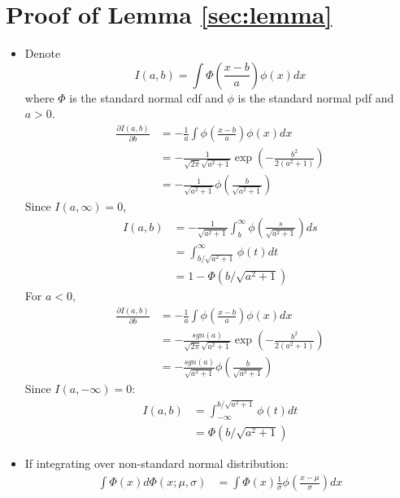 \documentclass[12pt]{article}
\begin{document}
\section{Proof of Lemma \ref{sec:lemma}}
\label{sec:proof}
\begin{itemize}
\item Denote
  \begin{displaymath}
    I(a,b) = \int \Phi \left( \frac{x-b}{a} \right)\phi(x) dx 
  \end{displaymath}
  where $\Phi$ is the standard normal cdf and $\phi$ is the standard normal
  pdf and $a > 0$.
  \begin{align*}
    \frac{\partial I(a,b)}{\partial b} & = - \frac{1}{a} \int \phi \left( \frac{x-b}{a} \right) \phi(x) dx \\
    & = - \frac{1}{\sqrt{2 \pi} \sqrt{a^2+1}} \exp \left( - \frac{b^2}{2(a^2+1)} \right)\\
    & = -\frac{1}{\sqrt{a^2+1}} \phi \left( \frac{b}{\sqrt{a^2+1}} \right)
  \end{align*}
  Since $I(a, \infty) = 0$,
  \begin{align}
    I(a,b) &= - \frac{1}{\sqrt{a^2+1}} \int_b^{\infty} \phi \left( \frac{s}{\sqrt{a^2+1}} \right) ds \nonumber \\
    &= \int_{b/\sqrt{a^2+1}}^{\infty} \phi(t) dt \nonumber\\
    \label{eq:int}
    & = 1- \Phi(b/\sqrt{a^2+1})
  \end{align}
  For $a < 0$,
  \begin{align*}
    \frac{\partial I(a,b)}{\partial b} & = - \frac{1}{a} \int \phi \left( \frac{x-b}{a} \right) \phi(x) dx \\
    & = - \frac{sgn(a)}{\sqrt{2 \pi} \sqrt{a^2+1}} \exp \left( - \frac{b^2}{2(a^2+1)} \right)\\
    & = -\frac{sgn(a)}{\sqrt{a^2+1}} \phi \left( \frac{b}{\sqrt{a^2+1}}
    \right)
  \end{align*}
  Since $I(a, -\infty) = 0$:
  \begin{align}
    I(a,b) &= \int^{b/\sqrt{a^2+1}}_{-\infty} \phi(t) dt \nonumber\\
    \label{eq:intneg}
    & = \Phi(b/\sqrt{a^2+1})
  \end{align}
\item If integrating over non-standard normal distribution:
  \begin{align*}
    \int \Phi(x)d\Phi(x; \mu, \sigma) & = \int \Phi(x) \frac{1}{\sigma} \phi \left( \frac{x-\mu}{\sigma} \right) dx \\

\end{align*}
\end{itemize}
\end{document}
